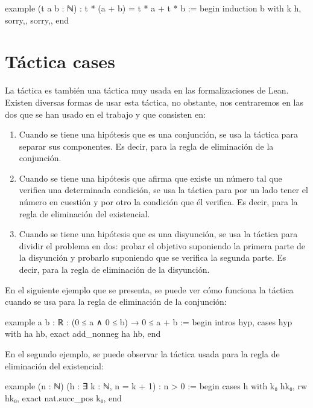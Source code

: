 \begin{leancode}
example (t a b : ℕ) : t * (a + b) = t * a + t * b :=
begin
  induction b with k h,
  {sorry,},
  {sorry,},
end
\end{leancode}

\section{Táctica cases}

La táctica  es también una táctica muy usada en
las formalizaciones de Lean. Existen diversas formas de usar esta
táctica, no obstante, nos centraremos en las dos que se han usado en el
trabajo y que consisten en:
\begin{enumerate}
\item Cuando se tiene una hipótesis que es una conjunción, se usa la
  táctica  para separar sus componentes. Es decir,
  para la regla de eliminación de la conjunción.

\item Cuando se tiene una hipótesis que afirma que existe un número tal
  que verifica una determinada condición, se usa la táctica
   para por un lado tener el número en cuestión y
  por otro la condición que él verifica. Es decir, para la regla de
  eliminación del existencial.

\item Cuando se tiene una hipótesis que es una disyunción, se usa la
  táctica  para dividir el problema en dos:
  probar el objetivo suponiendo la primera parte de la disyunción y
  probarlo suponiendo que se verifica la segunda parte. Es decir, para
  la regla de eliminación de la disyunción.
\end{enumerate}

En el siguiente ejemplo que se presenta, se puede ver cómo funciona la
táctica  cuando se usa para la regla de
eliminación de la conjunción:

\begin{leancode}
example {a b : ℝ} : (0 ≤ a ∧ 0 ≤ b) → 0 ≤ a + b :=
begin
  intros hyp,
  cases hyp with ha hb,
  exact add_nonneg ha hb,
end
\end{leancode}

En el segundo ejemplo, se puede observar la táctica
 usada para la regla de eliminación del
existencial:
\begin{leancode}
example (n : ℕ) (h : ∃ k : ℕ, n = k + 1) : n > 0 :=
begin
  cases h with k₀ hk₀,
  rw hk₀,
  exact nat.succ_pos k₀,
end
\end{leancode}


